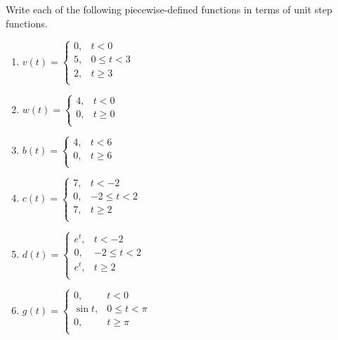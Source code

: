 \documentclass[12pt]{article}
\newcommand{\ds}{\displaystyle}
\newcommand{\ben}{\begin{enumerate}}
\newcommand{\een}{\end{enumerate}}
\newcommand{\<}{\langle}
\renewcommand{\>}{\rangle}
\def\ds{\displaystyle}
\begin{document}
	\newpage

	 Write each of the following piecewise-defined functions in terms of unit step functions.
	\ben[label=(\alph*)]
		\item  $\ds v(t)  =
		\left\{ \begin{array}{ll}
			0,	& t<0\\
			5,	& 0 \le t < 3\\
			2,	& t \ge 3\\
		\end{array} \right.$
		\vfill
										
		\item  $\ds w(t)  =
		\left\{ \begin{array}{ll}
			4,	& t<0\\
			0,	& t \ge 0\\	
		\end{array} \right.$
		\vfill
										
		\item  $\ds b(t)  =
		\left\{ \begin{array}{ll}
			4,	& t<6\\
			0,	& t \ge 6\\
		\end{array} \right.$
		\vfill
										
		\item  $\ds c(t)  =
		\left\{ \begin{array}{ll}
			7,	& t<-2\\
			0,	& -2 \le t < 2\\
			7,	& t \ge 2\\
		\end{array} \right.$
		\vfill
										
		\item  $\ds d(t)  =
		\left\{ \begin{array}{ll}
			e^t,	& t<-2\\
			0,	& -2 \le t < 2\\
			e^t,	& t \ge 2\\
		\end{array} \right.$
		\vfill \vspace{1cm}
										
		\item  $\ds g(t)  =
		\left\{ \begin{array}{ll}
			0,	& t<0\\
		\sin t,	& 0 \le t < \pi\\
			0,	& t \ge \pi\\
		\end{array} \right.$
		\vfill
	\een
\end{document}
